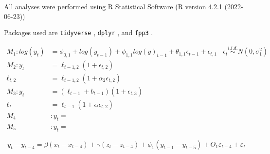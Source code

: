 \documentclass{monashthesis}
\begin{document}
All analyses were performed using R Statistical Software (R version 4.2.1 (2022-06-23))

Packages used are \texttt{tidyverse} \autocite{tidy19}, \texttt{dplyr} \autocite{dplyr23}, and \texttt{fpp3} \autocite{fpp23}.

\[\begin{aligned}
M_1: log(y_t) &= \phi_{0,1} + log(y_{t-1}) + \phi_{1,1}log(y)_{t-1} + \theta_{1,1}\epsilon_{t-1} + \epsilon_{t,1} \ \ \ \ \epsilon_t \stackrel{i.i.d.}{\sim} N(0,\sigma_1^2) \\
M_2: y_t &= \ell_{t-1,2}(1+\epsilon_{t,2}) \\
  \ell_{t,2} &= \ell_{t-1,2}(1+\alpha_2\epsilon_{t,2}) \\
M_3: y_t &= (\ell_{t-1}+b_{t-1}) (1+\epsilon_{t,3}) \\
  \ell_t &= \ell_{t-1}(1+\alpha\epsilon_{t,2}) \\
M_4&: y_t = \\
M_5&: y_t = 
\end{aligned}\]

\begin{equation}
  y_t - y_{t-4} = \beta (x_t-x_{t-4}) + \gamma (z_t-z_{t-4}) + \phi_1 (y_{t-1} - y_{t-5}) + \Theta_1 \varepsilon_{t-4} + \varepsilon_t
\end{equation}

\textcite{fpp3}

\printbibliography[title={Reference}]
\end{document}
